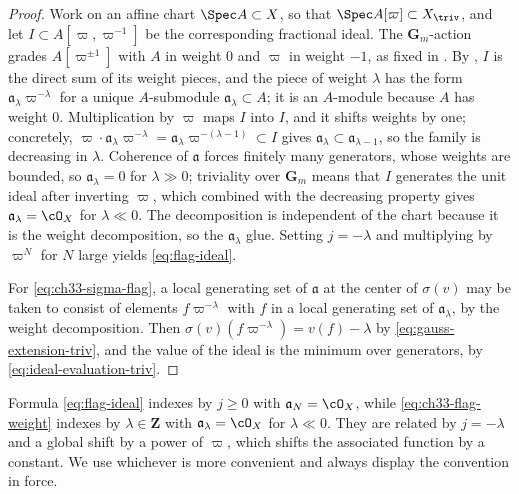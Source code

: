 \begin{proof}
Work on an affine chart $\Spec A\subset X$, so that
$\Spec A[\varpi]\subset X_{\triv}$, and let $I\subset A[\varpi,\varpi^{-1}]$
be the corresponding fractional ideal.  The $\mathbf G_m$-action grades
$A[\varpi^{\pm1}]$ with $A$ in weight $0$ and $\varpi$ in weight
$-1$, as fixed in .  By
, $I$ is the direct sum of its weight
pieces, and the piece of weight $\lambda$ has the form
$\mathfrak a_\lambda\varpi^{-\lambda}$ for a unique $A$-submodule
$\mathfrak a_\lambda\subset A$; it is an $A$-module
because $A$ has weight $0$.  Multiplication by $\varpi$ maps
$I$ into $I$, and it shifts weights by one; concretely,
$\varpi\cdot\mathfrak a_\lambda\varpi^{-\lambda}
=\mathfrak a_\lambda\varpi^{-(\lambda-1)}\subset I$ gives
$\mathfrak a_\lambda\subset\mathfrak a_{\lambda-1}$, so the family is
decreasing in $\lambda$.  Coherence of $\mathfrak a$ forces finitely
many generators, whose weights are bounded, so
$\mathfrak a_\lambda=0$ for $\lambda\gg0$; triviality over
$\mathbf G_m$ means that $I$ generates the unit ideal after inverting
$\varpi$, which combined with the decreasing property gives
$\mathfrak a_\lambda=\cO_X$ for $\lambda\ll0$.  The decomposition is
independent of the chart because it is the weight decomposition, so the
$\mathfrak a_\lambda$ glue.  Setting $j=-\lambda$ and multiplying by
$\varpi^{N}$ for $N$ large yields \eqref{eq:flag-ideal}.

For \eqref{eq:ch33-sigma-flag}, a local generating set of $\mathfrak a$ at
the center of $\sigma(v)$ may be taken to consist of elements
$f\varpi^{-\lambda}$ with $f$ in a local generating set of
$\mathfrak a_\lambda$, by the weight decomposition.  Then
$\sigma(v)(f\varpi^{-\lambda})=v(f)-\lambda$ by
\eqref{eq:gauss-extension-triv}, and the value of the ideal is the minimum
over generators, by \eqref{eq:ideal-evaluation-triv}.
\end{proof}

\begin{remark}
\label{rem:ch33-two-indexings}
Formula \eqref{eq:flag-ideal} indexes by $j\geq0$ with
$\mathfrak a_N=\cO_X$, while \eqref{eq:ch33-flag-weight} indexes by
$\lambda\in\mathbf Z$ with $\mathfrak a_\lambda=\cO_X$ for
$\lambda\ll0$.  They are related by $j=-\lambda$ and a global shift by a
power of $\varpi$, which shifts the associated function by a constant.  We
use whichever is more convenient and always display the convention in
force.
\end{remark}


